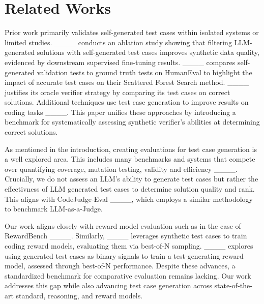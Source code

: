 \section{Related Works}
\label{sec:related_works}

Prior work primarily validates self-generated test cases within isolated systems or limited studies. ____ conducts an ablation study showing that filtering LLM-generated solutions with self-generated test cases improves synthetic data quality, evidenced by downstream supervised fine-tuning results. ____ compares self-generated validation tests to ground truth tests on HumanEval to highlight the impact of accurate test cases on their Scattered Forest Search method. ____ justifies its oracle verifier strategy by comparing its test cases on correct solutions. Additional techniques use test case generation to improve results on coding tasks ____.  This paper unifies these approaches by introducing a benchmark for systematically assessing synthetic verifier's abilities at determining correct solutions.

As mentioned in the introduction, creating evaluations for test case generation is a well explored area. This includes many benchmarks and systems that compete over quantifying coverage, mutation testing, validity and efficiency ____. Crucially, we do not assess an LLM's ability to generate test cases but rather the effectivness of LLM generated test cases to determine solution quality and rank. This aligns with CodeJudge-Eval ____, which employs a similar methodology to benchmark LLM-as-a-Judge.

Our work aligns closely with reward model evaluation such as in the case of RewardBench ____. Similarly, ____ leverages synthetic test cases to train coding reward models, evaluating them via best-of-N sampling. ____ explores using generated test cases as binary signals to train a test-generating reward model, assessed through best-of-N performance. Despite these advances, a standardized benchmark for comparative evaluation remains lacking. Our work addresses this gap while also advancing test case generation across state-of-the-art standard, reasoning, and reward models.







